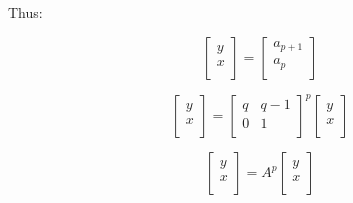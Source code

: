 \documentclass[paper.tex]{subfiles}
\begin{document}
Thus:

\[ 
\left[ \begin{array}{ccc}
y \\
x \\
\end{array} \right] 
=
\left[ \begin{array}{ccc}
a_{p+1} \\
a_{p} \\
\end{array} \right]
\] 

\[ 
\left[ \begin{array}{ccc}
y \\
x \\
\end{array} \right] 
=
\left[ \begin{array}{ccc}
q & q-1 \\
0 & 1 \\
\end{array} \right] ^{p}
\left[ \begin{array}{ccc}
y \\
x \\
\end{array} \right]
\] 

\[ 
\left[ \begin{array}{ccc}
y \\
x \\
\end{array} \right] 
=
A^{p}
\left[ \begin{array}{ccc}
y \\
x \\
\end{array} \right]
\] 
\end{document}
